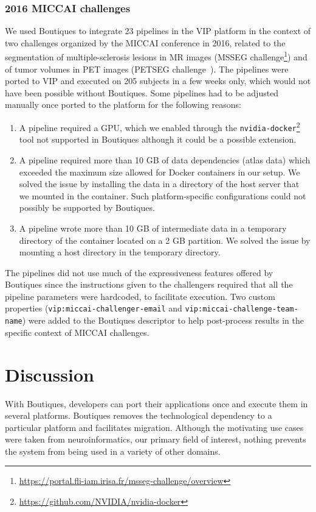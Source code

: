 \documentclass[a4paper,num-refs]{oup-contemporary}
\newcommand{\boutiques}{Boutiques\xspace}
\begin{document}
\subsubsection{2016 MICCAI challenges}

We used \boutiques to integrate 23 pipelines in the VIP platform in
the context of two challenges organized by the MICCAI conference in
2016, related to the segmentation of multiple-sclerosis lesions in MR
images (MSSEG
challenge\footnote{\url{https://portal.fli-iam.irisa.fr/msseg-challenge/overview}})
and of tumor volumes in PET images (PETSEG
challenge~\cite{hatt2018}). The
pipelines were ported to VIP and executed on 205 subjects in a few
weeks only, which would not have been possible without
\boutiques. Some pipelines had to be adjusted manually once ported to
the platform for the following reasons:
\begin{enumerate}
\item A pipeline
  required a GPU, which we enabled through the
  \texttt{nvidia-docker}\footnote{\url{https://github.com/NVIDIA/nvidia-docker}}
  tool not supported in Boutiques although it could be a possible extension.
\item A pipeline required more than 10 GB of data dependencies (atlas
  data) which exceeded the maximum size allowed for Docker containers
  in our setup. We solved the issue by installing the data in a
  directory of the host server that we mounted in the container. Such
  platform-specific configurations could not possibly be supported by
  \boutiques.
\item A pipeline wrote more than 10 GB of intermediate data in a
  temporary directory of the container located on a 2 GB partition. We
  solved the issue by mounting a host directory in the temporary directory. 
\end{enumerate}
The pipelines did not use much of the expressiveness features offered
by \boutiques since the instructions given to the challengers required
that all the pipeline parameters were hardcoded, to facilitate
execution. Two custom properties (\texttt{vip:miccai-challenger-email}
and \texttt{vip:miccai-challenge-team-name}) were added to the
\boutiques descriptor to help post-process results in the specific
context of MICCAI challenges.


\section{Discussion}
With \boutiques, developers can port their applications once and execute
them in several platforms. \boutiques removes the technological dependency to a
particular platform and facilitates migration.  Although the
motivating use cases were taken from neuroinformatics, our primary
field of interest, nothing prevents the system from being used in a
variety of other domains.
\end{document}
